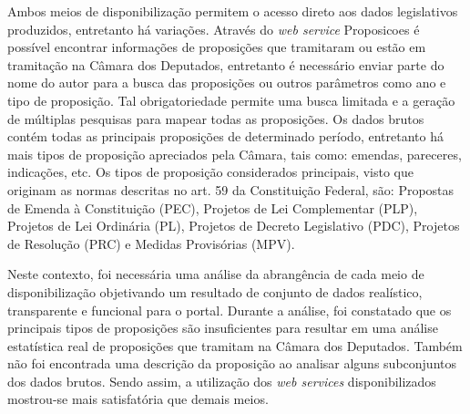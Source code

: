 \documentclass[
	12pt,				%
	openright,			%
	twoside,			%
	a4paper,			%
	english,			%
	french,				%
	spanish,			%
	brazil				%
	]{abntex2}
\begin{document}
Ambos meios de disponibilização permitem o acesso direto aos dados legislativos produzidos, entretanto há variações. 
Através do \emph{web service} Proposicoes é possível encontrar informações de proposições que tramitaram ou estão em tramitação
na Câmara dos Deputados, entretanto é necessário enviar parte do nome do autor para a busca das proposições ou outros parâmetros
como ano e tipo de proposição. Tal obrigatoriedade permite uma busca limitada e a geração de múltiplas pesquisas para mapear
todas as proposições. Os dados brutos contém todas as principais proposições de determinado período, entretanto há mais tipos 
de proposição apreciados pela Câmara, tais como: emendas, pareceres, indicações, etc. Os tipos de proposição considerados
principais, visto que originam as normas descritas no art. 59 da Constituição Federal, são: Propostas de Emenda à Constituição
(PEC), Projetos de Lei Complementar (PLP), Projetos de Lei Ordinária (PL), Projetos de Decreto Legislativo (PDC), Projetos de 
Resolução (PRC) e Medidas Provisórias (MPV). 

Neste contexto, foi necessária uma análise da abrangência de cada meio de disponibilização objetivando um resultado de conjunto
de dados realístico, transparente e funcional para o portal. Durante a análise, foi constatado que os principais tipos de 
proposições são insuficientes para resultar em uma análise estatística real de proposições que tramitam na Câmara dos Deputados.
Também não foi encontrada uma descrição da proposição ao analisar alguns subconjuntos dos dados brutos. Sendo assim, a
utilização dos \emph{web services} disponibilizados mostrou-se mais satisfatória que demais meios.
\end{document}
